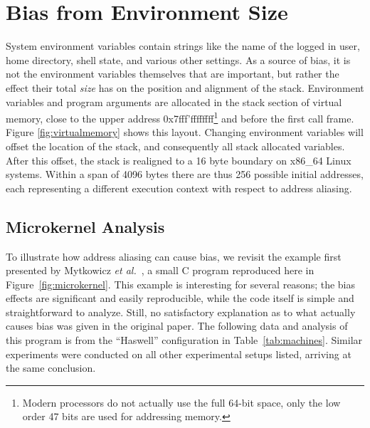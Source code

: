 \documentclass[10pt, conference, compsocconf]{IEEEtran}
\begin{document}
\section{Bias from Environment Size}
\label{sec:environment}
System environment variables contain strings like the name of the logged in user, home directory, shell state, and various other settings.
As a source of bias, it is not the environment variables themselves that are important, but rather the effect their total \emph{size} has on the position and alignment of the stack.
Environment variables and program arguments are allocated in the stack section of virtual memory, close to the upper address 0x7fff'ffffffff\footnote{Modern processors do not actually use the full 64-bit space, only the low order 47 bits are used for addressing memory.} and before the first call frame. Figure \ref{fig:virtualmemory} shows this layout.
Changing environment variables will offset the location of the stack, and consequently all stack allocated variables.
After this offset, the stack is realigned to a 16 byte boundary on x86_64 Linux systems.
Within a span of 4096 bytes there are thus 256 possible initial addresses, each representing a different execution context with respect to address aliasing. 

\subsection{Microkernel Analysis}
\label{sec:microkernel}
To illustrate how address aliasing can cause bias, we revisit the example first presented by Mytkowicz \emph{et al.}~\cite{Mytkowicz:2009:WrongData}, a small C program reproduced here in Figure~\ref{fig:microkernel}.
This example is interesting for several reasons; the bias effects are significant and easily reproducible, while the code itself is simple and straightforward to analyze.
Still, no satisfactory explanation as to what actually causes bias was given in the original paper.
The following data and analysis of this program is from the ``Haswell'' configuration in Table~\ref{tab:machines}.
Similar experiments were conducted on all other experimental setups listed, arriving at the same conclusion.
\end{document}
